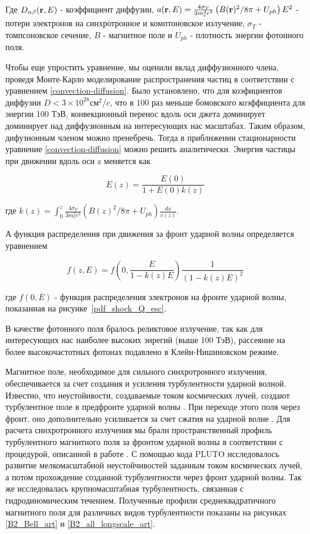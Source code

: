 Где $D_{\alpha \beta}({\bf r},E)$ - коэффициент диффузии,  $a({\bf r},E)=\frac{4\sigma_T}{3m_e^2c^3}\left(B({\bf r})^2/8\pi + U_{ph}\right)E^2$ - потери электронов на синхротронное и комптоновское излучение, $\sigma_T$ - томпсоновское сечение, $B$ - магнитное поле и $U_{ph}$ - плотность энергии фотонного поля. 

Чтобы еще упростить уравнение, мы оценили вклад диффузионного члена, проведя Монте-Карло моделирование распространения частиц в соответствии с уравнением \ref{convection-diffusion}. Было установлено, что для коэфициентов диффузии $D < 3\times 10^{28} см^2/c$, что в 100 раз меньше бомовского коэффициента для энергии 100 ТэВ, конвекционный перенос вдоль оси джета доминирует доминирует над диффузионным на интересующих нас масштабах. Таким образом, дифузионным членом можно пренебречь. Тогда в приближении стационарности уравнение \ref{convection-diffusion} можно решить аналитически.
Энергия частицы при движении вдоль оси z меняется как

\begin{equation}
	E(z) = \frac{E\left(0\right)}{1+E\left(0\right)k(z)}
\end{equation}

где $k(z) = \int_0^z \frac{4\sigma_T}{3m_e^2c^3}\left(B(z)^2/8\pi + U_{ph}\right) \frac{dx}{v(z)}$. 

А функция распределения при движения за фронт ударной волны определяется уравнением

\begin{equation}
	f(z,E)=f\left(0,\frac{E}{1-k(z)E}\right)\frac{1}{\left(1-k(z)E\right)^2}
\end{equation}

где $f(0,E)$ - функция распределения электронов на фронте ударной волны, показанная на рисунке~\ref{pdf_shock_Q_esc}. 

В качестве фотонного поля бралось реликтовое излучение, так как для интересующих нас наиболее высоких энрегий (выше 100 ТэВ), рассеяние на более высокочастотных фотонах подавлено в Клейн-Нишиновском режиме.

Магнитное поле, необходимое для сильного синхротронного излучения, обеспечивается за счет создания и усиления турбулентности ударной волной. Известно, что неустойивости, создаваемые током космических лучей, создают турбулентное поле в предфронте ударной волны \cite{Bell2004,Bykov3inst2014}. При переходе этого поля через фронт, оно дополнительно усиливается за счет сжатия на ударной волне \cite{Zirakashvili2008pol, Inoue13}. Для расчета синхротронного излучения мы брали пространственный профиль турбулентного магнитного поля за фронтом ударной волны в соответствии с процедурой, описанной в работе \cite{BykovTycho}. С помощью кода PLUTO исследовалось развитие мелкомасштабной неустойчивостей заданным током космических лучей, а потом прохождение созданной турбулентности через фронт ударной волны. Так же исследовалась крупномасштабная турбулентность, связанная с гидродиномическим течением. Полученные профили среднеквадратичного магнитного поля для различных видов турбулентности показаны на рисунках \ref{B2_Bell_art} и \ref{B2_all_longscale_art}.

